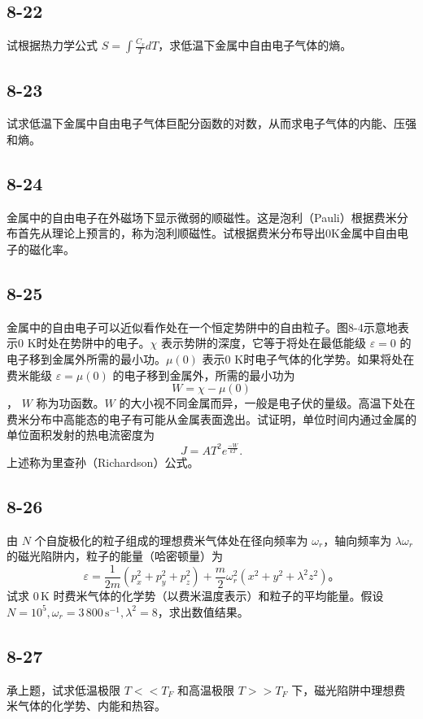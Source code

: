 \newpage
\subsection{8-22}
试根据热力学公式 $ S = \int \frac{C_v}{T} dT $，求低温下金属中自由电子气体的熵。

\newpage
\subsection{8-23}
试求低温下金属中自由电子气体巨配分函数的对数，从而求电子气体的内能、压强和熵。

\newpage
\subsection{8-24}
金属中的自由电子在外磁场下显示微弱的顺磁性。这是泡利（Pauli）根据费米分布首先从理论上预言的，称为泡利顺磁性。试根据费米分布导出0K金属中自由电子的磁化率。

\newpage
\subsection{8-25}
金属中的自由电子可以近似看作处在一个恒定势阱中的自由粒子。图8-4示意地表示0 K时处在势阱中的电子。$\chi$ 表示势阱的深度，它等于将处在最低能级 $\varepsilon = 0$ 的电子移到金属外所需的最小功。$\mu(0)$ 表示0 K时电子气体的化学势。如果将处在费米能级 $\varepsilon = \mu(0)$ 的电子移到金属外，所需的最小功为
$$ W = \chi - \mu(0) $$，
$W$ 称为功函数。$W$ 的大小视不同金属而异，一般是电子伏的量级。高温下处在费米分布中高能态的电子有可能从金属表面逸出。试证明，单位时间内通过金属的单位面积发射的热电流密度为
$$ J = AT^2 e^{\frac{-W}{kT}}. $$
上述称为里查孙（Richardson）公式。

\newpage
\subsection{8-26}
由 $ N $ 个自旋极化的粒子组成的理想费米气体处在径向频率为 $ \omega_r $，轴向频率为 $ \lambda \omega_r $ 的磁光陷阱内，粒子的能量（哈密顿量）为
$$ \varepsilon = \frac{1}{2m}(p_x^2 + p_y^2 + p_z^2) + \frac{m}{2}\omega_r^2(x^2 + y^2 + \lambda^2 z^2)。 $$
试求 $ 0 \, \text{K} $ 时费米气体的化学势（以费米温度表示）和粒子的平均能量。假设 $ N = 10^5, \omega_r = 3 \, 800 \, \text{s}^{-1}, \lambda^2 = 8 $，求出数值结果。

\newpage
\subsection{8-27}
承上题，试求低温极限 $T << T_F$ 和高温极限 $T >> T_F$ 下，磁光陷阱中理想费米气体的化学势、内能和热容。

